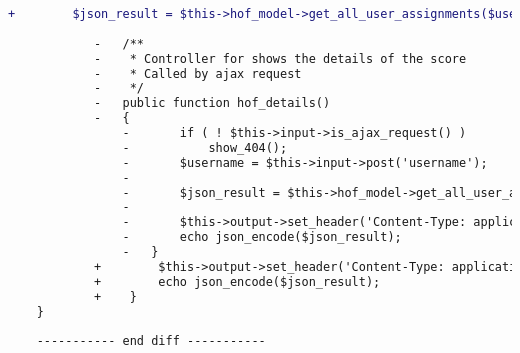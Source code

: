\begin{lstlisting}[language=diff, caption=Perubahan pada kode Halloffame.php]
			+        $json_result = $this->hof_model->get_all_user_assignments($username);
			
			-	/**
			-	 * Controller for shows the details of the score
			-	 * Called by ajax request
			-	 */
			-	public function hof_details()
			-	{
				-		if ( ! $this->input->is_ajax_request() )
				-			show_404();
				-		$username = $this->input->post('username');
				-
				-		$json_result = $this->hof_model->get_all_user_assignments($username);
				-
				-		$this->output->set_header('Content-Type: application/json; charset=utf-8');
				-		echo json_encode($json_result);
				-	}
			+        $this->output->set_header('Content-Type: application/json; charset=utf-8');
			+        echo json_encode($json_result);
			+    }
	}
	
	----------- end diff -----------
\end{lstlisting}

